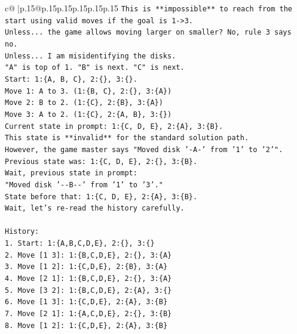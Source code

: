 \documentclass{article}
\begin{document}
{\begin{supertabular}{c@{$\;$}|p{.15\linewidth}@{}p{.15\linewidth}p{.15\linewidth}p{.15\linewidth}p{.15\linewidth}p{.15\linewidth}}
{{{\texttt{This is **impossible** to reach from the start using valid moves if the goal is 1{-}>3.} \\
\texttt{Unless... the game allows moving larger on smaller? No, rule 3 says no.} \\
\texttt{Unless... I am misidentifying the disks.} \\
\texttt{"A" is top of 1. "B" is next. "C" is next.} \\
\texttt{Start: 1:\{A, B, C\}, 2:\{\}, 3:\{\}.} \\
\texttt{Move 1: A to 3. (1:\{B, C\}, 2:\{\}, 3:\{A\})} \\
\texttt{Move 2: B to 2. (1:\{C\}, 2:\{B\}, 3:\{A\})} \\
\texttt{Move 3: A to 2. (1:\{C\}, 2:\{A, B\}, 3:\{\})} \\
\texttt{Current state in prompt: 1:\{C, D, E\}, 2:\{A\}, 3:\{B\}.} \\
\texttt{This state is **invalid** for the standard solution path.} \\
\texttt{However, the game master says "Moved disk '{-}A{-}' from '1' to '2'".} \\
\texttt{Previous state was: 1:\{C, D, E\}, 2:\{\}, 3:\{B\}.} \\
\texttt{Wait, previous state in prompt:} \\
\texttt{"Moved disk '{-}{-}B{-}{-}' from '1' to '3'."} \\
\texttt{State before that: 1:\{C, D, E\}, 2:\{A\}, 3:\{B\}.} \\
\texttt{Wait, let's re{-}read the history carefully.} \\
\\ 
\texttt{History:} \\
\texttt{1. Start: 1:\{A,B,C,D,E\}, 2:\{\}, 3:\{\}} \\
\texttt{2. Move {[}1 3{]}: 1:\{B,C,D,E\}, 2:\{\}, 3:\{A\}} \\
\texttt{3. Move {[}1 2{]}: 1:\{C,D,E\}, 2:\{B\}, 3:\{A\}} \\
\texttt{4. Move {[}2 1{]}: 1:\{B,C,D,E\}, 2:\{\}, 3:\{A\}} \\
\texttt{5. Move {[}3 2{]}: 1:\{B,C,D,E\}, 2:\{A\}, 3:\{\}} \\
\texttt{6. Move {[}1 3{]}: 1:\{C,D,E\}, 2:\{A\}, 3:\{B\}} \\
\texttt{7. Move {[}2 1{]}: 1:\{A,C,D,E\}, 2:\{\}, 3:\{B\}} \\
\texttt{8. Move {[}1 2{]}: 1:\{C,D,E\}, 2:\{A\}, 3:\{B\}} \\
\\ 
}}}
\end{supertabular}}
\end{document}

